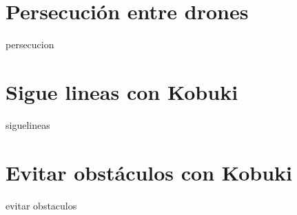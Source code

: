 \section{Persecución entre drones}
\label{sec:persecucion-drones}

persecucion

\section{Sigue lineas con Kobuki}
\label{sec:sigue-lineas}

siguelineas

\section{Evitar obstáculos con Kobuki}
\label{sec:evitar-obstaculos}

evitar obstaculos

